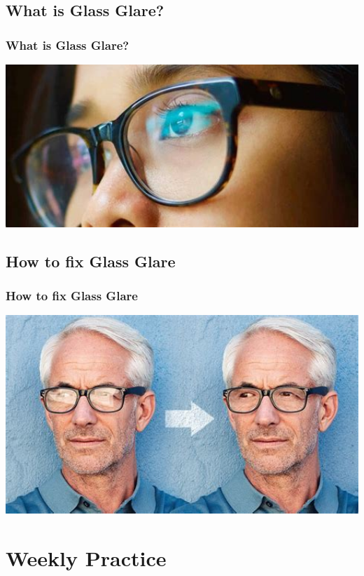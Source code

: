 \documentclass{beamer}
\begin{document}
			\subsection{What is Glass Glare?}		
				\begin{frame}
					\frametitle{What is Glass Glare?}
					\begin{center}
					\includegraphics[width=1.0\textwidth]{images/glass glare.jpg}
				\end{center}
				\end{frame}

			\subsection{How to fix Glass Glare}		
\begin{frame}
	\frametitle{How to fix Glass Glare}
					\begin{center}
	\includegraphics[width=1.0\textwidth]{images/remove glass glare.jpg}
\end{center}
\end{frame}

\section{Weekly Practice}
\end{document}
